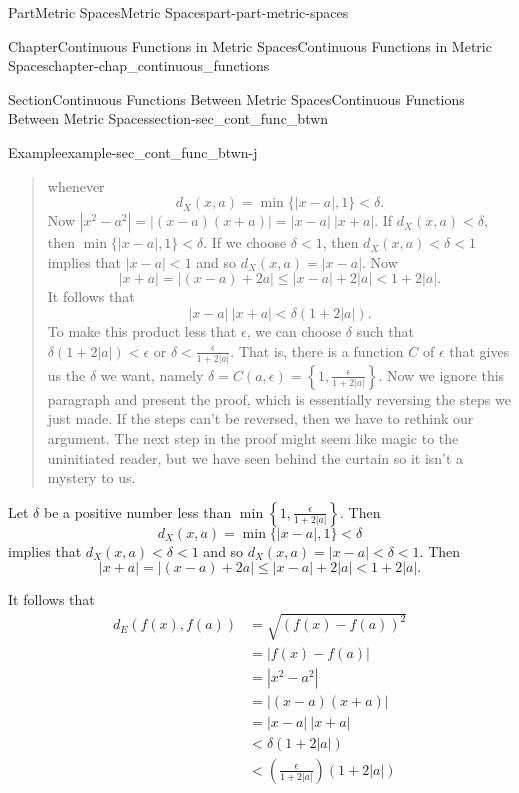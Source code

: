 \documentclass[oneside,10pt,]{book}
\numberwithin{equation}{chapter}
\newcommand{\lt}{<}
\newcommand{\amp}{&}
\begin{document}
\begin{partptx}{Part}{Metric Spaces}{}{Metric Spaces}{}{}{part-part-metric-spaces}
\begin{chapterptx}{Chapter}{Continuous Functions in Metric Spaces}{}{Continuous Functions in Metric Spaces}{}{}{chapter-chap_continuous_functions}
\begin{sectionptx}{Section}{Continuous Functions Between Metric Spaces}{}{Continuous Functions Between Metric Spaces}{}{}{section-sec_cont_func_btwn}
\begin{example}{Example}{}{example-sec_cont_func_btwn-j}
\begin{quote}
whenever%
\begin{equation*}
d_X(x,a) = \min\{|x-a|, 1\} \lt  \delta\text{.}
\end{equation*}
Now \(|x^2-a^2| = |(x-a)(x+a)| = |x-a| \ |x+a|\). If \(d_X(x,a) \lt  \delta\), then \(\min\{|x-a|, 1\} \lt  \delta\). If we choose \(\delta \lt  1\), then \(d_X(x,a) \lt  \delta \lt  1\) implies that \(|x-a| \lt  1\) and so \(d_X(x,a) = |x-a|\). Now%
\begin{equation*}
|x+a| = |(x-a) + 2a| \leq |x-a| + 2|a| \lt  1+2|a|\text{.}
\end{equation*}
It follows that%
\begin{equation*}
|x-a| \ |x+a| \lt  \delta(1+2|a|)\text{.}
\end{equation*}
To make this product less that \(\epsilon\), we can choose \(\delta\) such that \(\delta(1+2|a|) \lt  \epsilon\) or \(\delta \lt  \frac{\epsilon}{1+2|a|}\). That is, there is a function \(C\) of \(\epsilon\) that gives us the \(\delta\) we want, namely \(\delta = C(a,\epsilon) = \left\{1, \frac{\epsilon}{1+2|a|}\right\}\). Now we ignore this paragraph and present the proof, which is essentially reversing the steps we just made. If the steps can't be reversed, then we have to rethink our argument. The next step in the proof might seem like magic to the uninitiated reader, but we have seen behind the curtain so it isn't a mystery to us.%
\end{quote}
Let \(\delta\) be a positive number less than \(\min\left\{1, \frac{\epsilon}{1+2|a|}\right\}\). Then%
\begin{equation*}
d_X(x,a) = \min\{|x-a|,1\} \lt  \delta
\end{equation*}
implies that \(d_X(x,a) \lt  \delta \lt  1\) and so \(d_X(x,a) = |x-a| \lt  \delta \lt  1\). Then%
\begin{equation*}
|x+a| = |(x-a) + 2a| \leq |x-a| + 2|a| \lt  1+2|a|\text{.}
\end{equation*}
%
\par
It follows that%
\begin{align*}
d_E(f(x),f(a)) \amp = \sqrt{(f(x)-f(a))^2}\\
\amp = |f(x)-f(a)|\\
\amp = |x^2-a^2|\\
\amp = |(x-a)(x+a)|\\
\amp = |x-a| \ |x+a|\\
\amp \lt  \delta (1+2|a|)\\
\amp \lt   \left(\frac{\epsilon}{1+2|a|}\right) (1+2|a|)\\

\end{align*}
\end{example}
\end{sectionptx}
\end{chapterptx}
\end{partptx}
\end{document}
